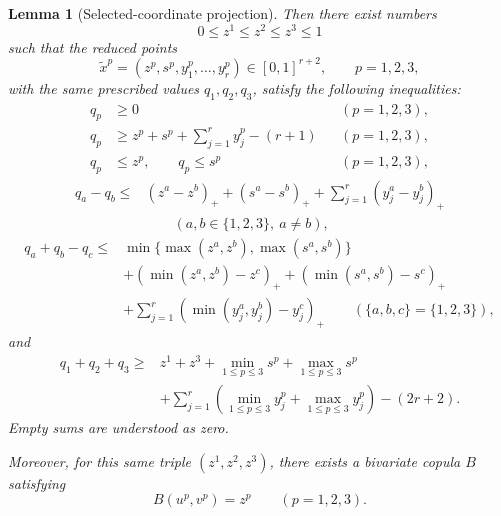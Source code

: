 \documentclass[a4paper,11pt]{amsart}
\numberwithin{equation}{section}
\newtheorem{lemma}[lemma]{Lemma}
\theoremstyle{definition}
\theoremstyle{remark}
\begin{document}
\begin{lemma}[Selected-coordinate projection]
Then there exist numbers
\[
 0\le z^1\le z^2\le z^3\le1
\]
such that the reduced points
\[
 \widetilde x^p=(z^p,s^p,y_1^p,\ldots,y_r^p)\in[0,1]^{r+2},
 \qquad p=1,2,3,
\]
with the same prescribed values $q_1,q_2,q_3$, satisfy the following
inequalities:
\begin{align}
 q_p&\ge0
 &&(p=1,2,3),\tag{R1}\label{eq:R1}\\
 q_p&\ge z^p+s^p+\sum_{j=1}^r y_j^p-(r+1)
 &&(p=1,2,3),\tag{R2}\label{eq:R2}\\
 q_p&\le z^p,\qquad q_p\le s^p
 &&(p=1,2,3),\tag{R3}\label{eq:R3}
\end{align}
\begin{equation}
\begin{aligned}
 q_a-q_b\le{}&
 (z^a-z^b)_++(s^a-s^b)_+
 +\sum_{j=1}^r(y_j^a-y_j^b)_+\\
 &\hspace{2em}(a,b\in\{1,2,3\},\ a\ne b),
\end{aligned}
\tag{R4}\label{eq:R4}
\end{equation}
\begin{equation}
\begin{aligned}
 q_a+q_b-q_c\le{}&
 \min\bigl\{\max(z^a,z^b),\max(s^a,s^b)\bigr\}\\
 &+(\min(z^a,z^b)-z^c)_+
  +(\min(s^a,s^b)-s^c)_+\\
 &+\sum_{j=1}^r(\min(y_j^a,y_j^b)-y_j^c)_+
 \qquad(\{a,b,c\}=\{1,2,3\}),
\end{aligned}
\tag{R5}\label{eq:R5}
\end{equation}
and
\begin{equation}
\begin{aligned}
 q_1+q_2+q_3\ge{}&
 z^1+z^3+\min_{1\le p\le3}s^p+\max_{1\le p\le3}s^p\\
 &+\sum_{j=1}^r
 \left(\min_{1\le p\le3}y_j^p+\max_{1\le p\le3}y_j^p\right)
 -(2r+2).
\end{aligned}
\tag{R6}\label{eq:R6}
\end{equation}
Empty sums are understood as zero.

Moreover, for this same triple $(z^1,z^2,z^3)$, there exists a
bivariate copula $B$ satisfying
\[
 B(u^p,v^p)=z^p\qquad(p=1,2,3).
\]
\end{lemma}
\end{document}
